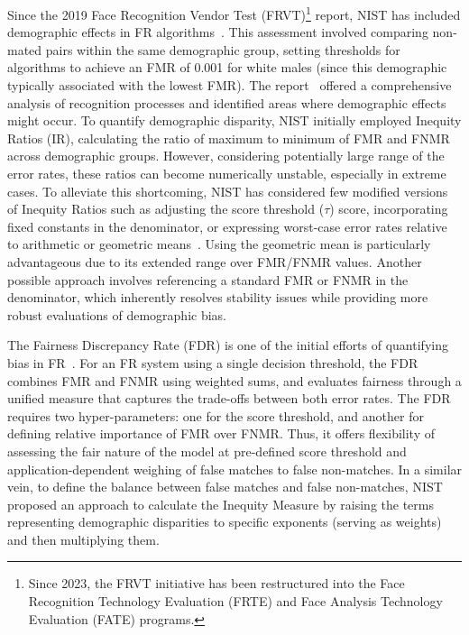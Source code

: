 Since the 2019 Face Recognition Vendor Test (FRVT)\footnote{Since 2023, the
FRVT initiative has been restructured into the Face Recognition Technology
Evaluation (FRTE) and Face Analysis Technology Evaluation (FATE) programs.}
report, NIST has included demographic effects in FR algorithms~\cite{frvt3}.
This assessment involved comparing non-mated pairs within the same demographic
group, setting thresholds for algorithms to achieve an FMR of 0.001 for white
males (since this demographic typically associated with the lowest FMR). The
report~\cite{frvt3} offered a comprehensive analysis of recognition processes
and identified areas where demographic effects might occur. 
%
To quantify demographic disparity, NIST initially employed Inequity Ratios
(IR), calculating the ratio of maximum to minimum of FMR and FNMR across
demographic groups. However, considering potentially large range of the error
rates, these ratios can become numerically unstable, especially in extreme
cases. To alleviate this shortcoming, NIST has considered few modified versions
of Inequity Ratios such as adjusting the score threshold ($\tau$) score,
incorporating fixed constants in the denominator, or expressing worst-case
error rates relative to arithmetic or geometric means~\cite{grother2022face}.
Using the geometric mean is particularly advantageous due to its extended range
over FMR/FNMR values. Another possible approach involves referencing a standard
FMR or FNMR in the denominator, which inherently resolves stability issues
while providing more robust evaluations of demographic bias.

The Fairness Discrepancy Rate (FDR) is one of the initial efforts of quantifying
bias in FR~\cite{de2021fairness}. For an FR system using a single decision
threshold, the FDR combines FMR and FNMR using weighted sums, and evaluates
fairness through a unified measure that captures the trade-offs between both
error rates. The FDR requires two hyper-parameters: one for the score threshold,
and another for defining relative importance of FMR over FNMR. Thus, it offers
flexibility of assessing the fair nature of the model at pre-defined score
threshold and application-dependent weighing of false matches to false
non-matches.  In a similar vein, to define the balance between false matches and
false non-matches, NIST proposed an approach to calculate the Inequity Measure
by raising the terms representing demographic disparities to specific exponents
(serving as weights) and then multiplying them. 


%

